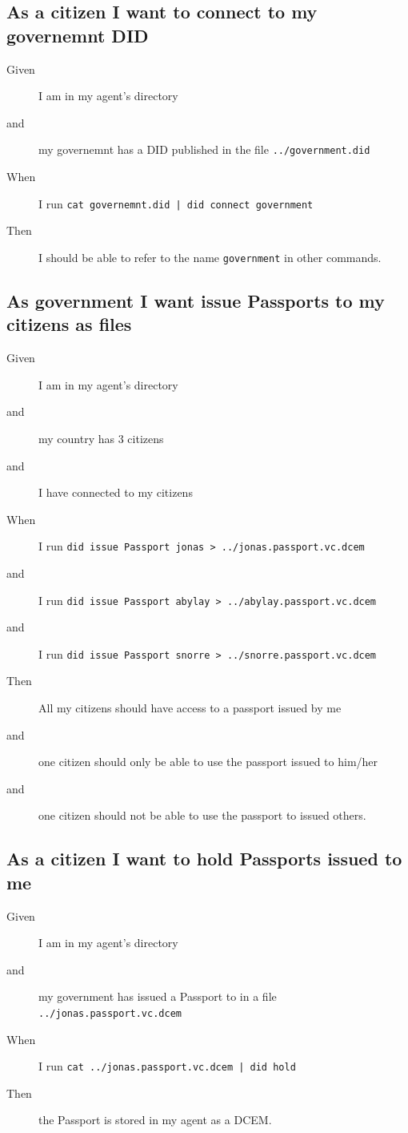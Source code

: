 \subsection{As a citizen I want to connect to my governemnt DID}
\begin{description}
    \item[Given] I am in my agent's directory
    \item[and] my governemnt has a DID published in the file \texttt{../government.did}
    \item[When] I run \texttt{cat governemnt.did | did connect government}
    \item[Then] I should be able to refer to the name \texttt{government} in other commands.
\end{description}



\subsection{As government I want issue Passports to my citizens as files}
\begin{description}
    \item[Given] I am in my agent's directory
    \item[and] my country has 3 citizens 
    \item[and] I have connected to my citizens
    \item[When] I run \texttt{did issue Passport jonas > ../jonas.passport.vc.dcem}
    \item[and] I run \texttt{did issue Passport abylay > ../abylay.passport.vc.dcem}
    \item[and] I run \texttt{did issue Passport snorre > ../snorre.passport.vc.dcem}
    \item[Then] All my citizens should have access to a passport issued by me
    \item[and] one citizen should only be able to use the passport issued to him/her
    \item[and] one citizen should not be able to use the passport to issued others.
\end{description}



\subsection{As a citizen I want to hold Passports issued to me}
\begin{description}
    \item[Given] I am in my agent's directory
    \item[and] my government has issued a Passport to in a file \texttt{../jonas.passport.vc.dcem}
    \item[When] I run \texttt{cat ../jonas.passport.vc.dcem | did hold}
    \item[Then] the Passport is stored in my agent as a DCEM.
\end{description}



